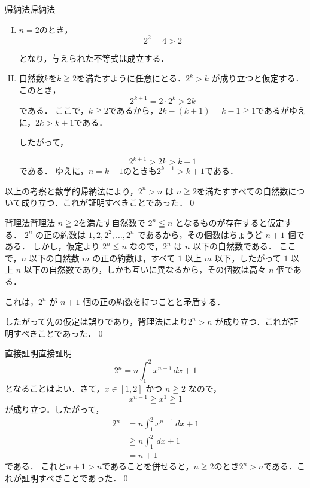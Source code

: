 \begin{example}{帰納法}{帰納法}
  \begin{enumerate}[(I)]
    \item $n=2$のとき，
          \[
            2^2 = 4 > 2
          \]

          となり，与えられた不等式は成立する．
    \item 自然数$k$を$k \geqq 2$を満たすように任意にとる．$2^k > k$ が成り立つと仮定する．このとき，
          \[
            2^{k+1} = 2 \cdot 2^k > 2k
          \]
          である．
          ここで，$k \geqq 2$であるから，$2k - (k + 1) = k - 1 \geqq 1$であるがゆえに，$2k > k + 1$である．

          したがって，

          \[
            2^{k+1} > 2k > k + 1
          \]
          である．
          ゆえに，$n=k+1$のときも$2^{k+1} > k + 1$である．
  \end{enumerate}

  以上の考察と数学的帰納法により，$2^n > n$ は $n \geqq 2$を満たすすべての自然数について成り立つ．これが証明すべきことであった．\qed
\end{example}

\begin{example}{背理法}{背理法}
  $n \geqq 2$を満たす自然数で $2^n \leqq n$ となるものが存在すると仮定する．
  $2^n$ の正の約数は $1, 2, 2^2, \dots, 2^n$ であるから，その個数はちょうど $n + 1$ 個である．
  しかし，仮定より $2^n \leqq n$ なので，$2^n$ は $n$ 以下の自然数である．
  ここで，$n$ 以下の自然数 $m$ の正の約数は，すべて $1$ 以上 $m$ 以下，したがって $1$ 以上 $n$ 以下の自然数であり，しかも互いに異なるから，その個数は高々 $n$ 個である．

  これは，$2^n$ が $n + 1$ 個の正の約数を持つことと矛盾する．

  したがって先の仮定は誤りであり，背理法により$2^n > n$ が成り立つ．これが証明すべきことであった．\qed
\end{example}

\begin{example}{直接証明}{直接証明}
  \[
    2^n = n \int_{1}^{2} x^{n-1} \, dx + 1
  \]
  となることはよい．さて，$x \in [1, 2]$ かつ $n \geqq 2$ なので，
  \[
    x^{n-1} \geqq x^{1} \geqq 1
  \]
  が成り立つ．したがって，
  \begin{align*}
    2^n & = n \int_{1}^{2} x^{n-1} \, dx + 1 \\
        & \geqq  n \int_{1}^{2} \, dx +1     \\
        & = n+1
  \end{align*}
  である．
  これと$n+1 >n$であることを併せると，$n \geqq 2$のとき$2^n > n$である．これが証明すべきことであった．\qed
\end{example}

